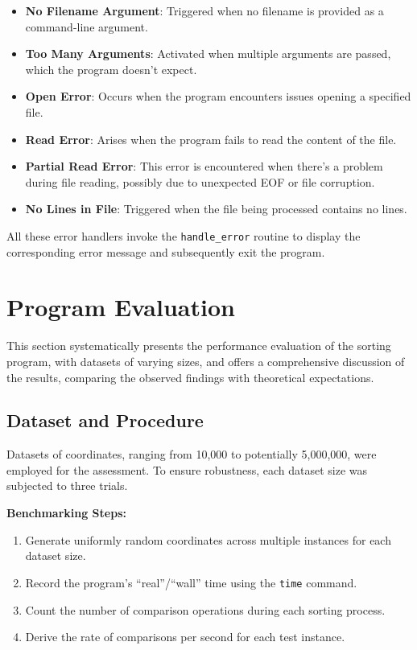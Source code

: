 \documentclass[12pt,a4paper]{article}
\begin{document}
\begin{itemize}
    \item \textbf{No Filename Argument}: Triggered when no filename is provided as a command-line argument. 
    \item \textbf{Too Many Arguments}: Activated when multiple arguments are passed, which the program doesn't expect.
    \item \textbf{Open Error}: Occurs when the program encounters issues opening a specified file.
    \item \textbf{Read Error}: Arises when the program fails to read the content of the file.
    \item \textbf{Partial Read Error}: This error is encountered when there's a problem during file reading, possibly due to unexpected EOF or file corruption.
    \item \textbf{No Lines in File}: Triggered when the file being processed contains no lines.
\end{itemize}

All these error handlers invoke the \texttt{handle\_error} routine to display the corresponding error message and subsequently exit the program.

\section{Program Evaluation}

This section systematically presents the performance evaluation of the sorting program, with datasets of varying sizes, and offers a comprehensive discussion of the results, comparing the observed findings with theoretical expectations.

\subsection{Dataset and Procedure}

Datasets of coordinates, ranging from 10,000 to potentially 5,000,000, were employed for the assessment. To ensure robustness, each dataset size was subjected to three trials.

\textbf{Benchmarking Steps:}
\begin{enumerate}
    \item Generate uniformly random coordinates across multiple instances for each dataset size.
    \item Record the program's “real”/“wall” time using the \texttt{time} command.
    \item Count the number of comparison operations during each sorting process.
    \item Derive the rate of comparisons per second for each test instance.
\end{enumerate}
\end{document}
